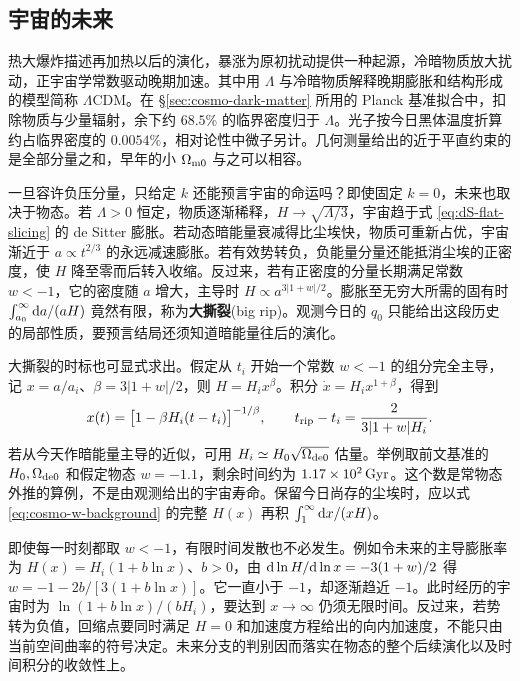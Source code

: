 \subsection{宇宙的未来}

热大爆炸描述再加热以后的演化，暴涨为原初扰动提供一种起源，冷暗物质放大扰动，正宇宙学常数驱动晚期加速。其中用 $\Lambda$ 与冷暗物质解释晚期膨胀和结构形成的模型简称 $\Lambda$CDM。在 \S\ref{sec:cosmo-dark-matter} 所用的 Planck 基准拟合中，扣除物质与少量辐射，余下约 $68.5\%$ 的临界密度归于 $\Lambda$。光子按今日黑体温度折算约占临界密度的 $0.0054\%$，相对论性中微子另计。几何测量给出的近于平直约束的是全部分量之和，早年的小 $\Omega_{\rm m0}$ 与之可以相容。

一旦容许负压分量，只给定 $k$ 还能预言宇宙的命运吗？即使固定 $k=0$，未来也取决于物态。若 $\Lambda>0$ 恒定，物质逐渐稀释，$H\to\sqrt{\Lambda/3}$，宇宙趋于式 \eqref{eq:dS-flat-slicing} 的 de Sitter 膨胀。若动态暗能量衰减得比尘埃快，物质可重新占优，宇宙渐近于 $a\propto t^{2/3}$ 的永远减速膨胀。若有效势转负，负能量分量还能抵消尘埃的正密度，使 $H$ 降至零而后转入收缩。反过来，若有正密度的分量长期满足常数 $w<-1$，它的密度随 $a$ 增大，主导时 $H\propto a^{3|1+w|/2}$。膨胀至无穷大所需的固有时 $\int_{a_0}^\infty \dd a/(aH)$ 竟然有限，称为\textbf{大撕裂}(big rip)。观测今日的 $q_0$ 只能给出这段历史的局部性质，要预言结局还须知道暗能量往后的演化。


大撕裂的时标也可显式求出。假定从 $t_i$ 开始一个常数 $w<-1$ 的组分完全主导，记 $x=a/a_i$、$\beta=3|1+w|/2$，则 $H=H_i x^\beta$。积分 $\dot x=H_i x^{1+\beta}$，得到
\[
 x(t)=\big[1-\beta H_i(t-t_i)\big]^{-1/\beta},
 \qquad t_{\rm rip}-t_i=\frac{2}{3|1+w|H_i}.
\]
若从今天作暗能量主导的近似，可用 $H_i\simeq H_0\sqrt{\Omega_{\rm de0}}$ 估量。举例取前文基准的 $H_0,\Omega_{\rm de0}$ 和假定物态 $w=-1.1$，剩余时间约为 $1.17\times10^2\,{\rm Gyr}$。这个数是常物态外推的算例，不是由观测给出的宇宙寿命。保留今日尚存的尘埃时，应以式 \eqref{eq:cosmo-w-background} 的完整 $H(x)$ 再积 $\int_1^\infty \dd x/(xH)$。

即使每一时刻都取 $w<-1$，有限时间发散也不必发生。例如令未来的主导膨胀率为 $H(x)=H_i(1+b\ln x)$、$b>0$，由 $\dd\ln H/\dd\ln x=-3(1+w)/2$ 得 $w=-1-2b/[3(1+b\ln x)]$。它一直小于 $-1$，却逐渐趋近 $-1$。此时经历的宇宙时为 $\ln(1+b\ln x)/(bH_i)$，要达到 $x\to\infty$ 仍须无限时间。反过来，若势转为负值，回缩点要同时满足 $H=0$ 和加速度方程给出的向内加速度，不能只由当前空间曲率的符号决定。未来分支的判别因而落实在物态的整个后续演化以及时间积分的收敛性上。
